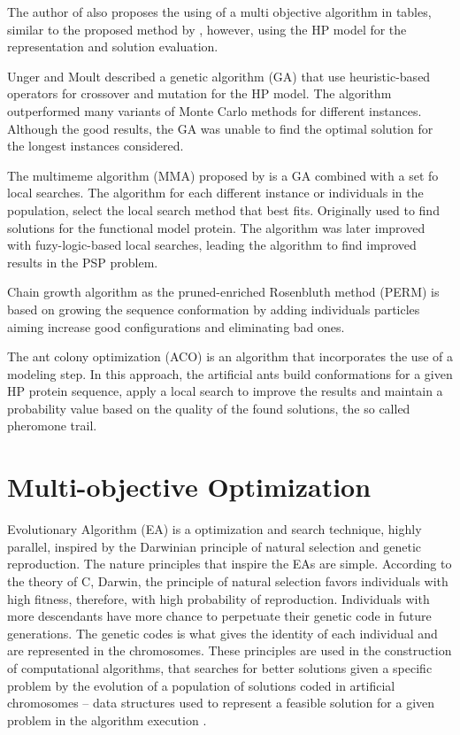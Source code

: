 The author of \cite{gabriel2012algoritmos} also proposes the using of a multi objective algorithm in tables, similar to the proposed method by \cite{soares2011investigating}, however, using the HP model for the representation and solution evaluation.

Unger and Moult \cite{unger1993genetic} described a genetic algorithm (GA) that use heuristic-based operators for crossover and mutation for the HP model. The algorithm outperformed many variants of Monte Carlo methods for different instances. Although the good results, the GA was unable to find the optimal solution for the longest instances considered.


The multimeme algorithm (MMA) proposed by \cite{krasnogor2002multimeme} is a GA combined with a set fo local searches. The algorithm for each different instance or individuals in the population, select the local search method that best fits. Originally used to find solutions for the functional model protein. The algorithm was later improved with fuzy-logic-based local searches, leading the algorithm to find improved results in the PSP problem.


Chain growth algorithm as the pruned-enriched Rosenbluth method (PERM) \cite{hsu2003growth} is based on growing the sequence conformation by adding individuals particles aiming increase good configurations and eliminating bad ones.

The ant colony optimization (ACO) \cite{shmygelska2002ant, shmygelska2003improved} is an algorithm that incorporates the use of a modeling step. In this approach, the artificial ants build conformations for a given HP protein sequence, apply a local search to improve the results and maintain a probability value based on the quality of the found solutions, the so called pheromone trail.

\section{Multi-objective Optimization} \label{sec:optimization}


Evolutionary Algorithm (EA) is a optimization and search technique, highly parallel, inspired by the Darwinian principle of natural selection and genetic reproduction. The nature principles that inspire the EAs are simple. According to the theory of C, Darwin, the principle of natural selection favors individuals with high fitness, therefore, with high probability of reproduction. Individuals with more descendants have more chance to perpetuate their genetic code in future generations. The genetic codes is what gives the identity of each individual and are represented in the chromosomes. These principles are used in the construction of computational algorithms, that searches for better solutions given a specific problem by the evolution of a population of solutions coded in artificial chromosomes -- data structures used to represent a feasible solution for a given problem in the algorithm execution \cite{pacheco1999algoritmos}.


